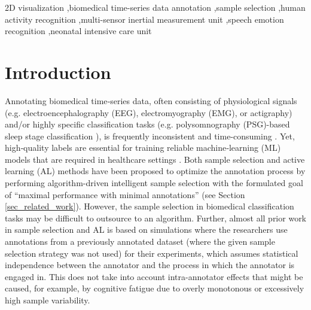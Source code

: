 \documentclass[a4paper,fleqn]{cas-dc}
\begin{document}

\begin{keywords}
 2D visualization \sep biomedical time-series data annotation \sep sample selection \sep human activity recognition \sep multi-sensor inertial measurement unit \sep speech emotion recognition \sep neonatal intensive care unit
\end{keywords}

\maketitle

\section{Introduction} \label{sec_introduction}

Annotating biomedical time‑series data, often consisting of physiological signals (e.g. electroencephalography (EEG), electromyography (EMG), or actigraphy) and/or highly specific classification tasks (e.g. polysomnography (PSG)-based sleep stage classification \cite{psg_al_initialization}), is frequently inconsistent and time-consuming \cite{watson_clinical_data_annotation_time_consuming, impact_of_inconsistent_annotations_ai_driven_decision_making, interrator_reliability_estimators, eeg_improved_manual_annotation, multi_interactive_learning_model_sleep_staging, robustsleepnet}. Yet, high‑quality labels are essential for training reliable machine‑learning (ML) models that are required in healthcare settings \cite{impact_of_inconsistent_annotations_ai_driven_decision_making, iar_2_0, medical_image_analysis_noise_labels_survey, dl_noisy_labels_medical_prediction_problems, noise_in_gold_labels, deep_self_cleansing_with_noisy_labels, benchmarking_real_world_medical_image_survey_paper}. Both sample selection and active learning (AL) methods have been proposed to optimize the annotation process by performing algorithm-driven intelligent sample selection with the formulated goal of ``maximal performance with minimal annotations'' (see Section \ref{sec_related_work}). However, the sample selection in biomedical classification tasks may be difficult to outsource to an algorithm. Further, almost all prior work in sample selection and AL is based on simulations where the researchers use annotations from a previously annotated dataset (where the given sample selection strategy was not used) for their experiments, which assumes statistical independence between the annotator and the process in which the annotator is engaged in. This does not take into account intra-annotator effects that might be caused, for example, by cognitive fatigue due to overly monotonous or excessively high sample variability.
\end{document}
